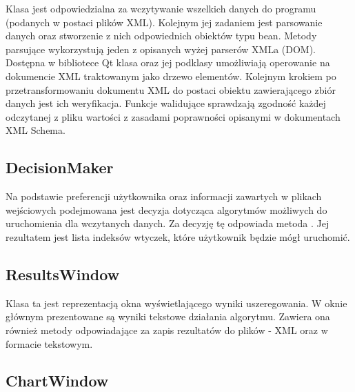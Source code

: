 Klasa  jest odpowiedzialna za wczytywanie wszelkich danych do programu (podanych w postaci plików XML). Kolejnym jej zadaniem jest 
parsowanie danych oraz stworzenie z nich odpowiednich obiektów typu bean. Metody parsujące wykorzystują jeden z opisanych wyżej parserów XMLa (DOM). 
Dostępna w bibliotece Qt klasa  oraz jej podklasy umożliwiają operowanie na dokumencie XML traktowanym jako drzewo elementów. 
Kolejnym krokiem po przetransformowaniu dokumentu XML do postaci obiektu zawierającego zbiór danych jest ich weryfikacja. Funkcje walidujące 
sprawdzają zgodność każdej odczytanej z pliku wartości z zasadami poprawności opisanymi w dokumentach XML Schema.

\subsection{DecisionMaker}

Na podstawie preferencji użytkownika oraz informacji zawartych w plikach wejściowych podejmowana jest decyzja dotycząca algorytmów możliwych 
do uruchomienia dla wczytanych danych. Za decyzję tę odpowiada metoda . Jej rezultatem jest lista indeksów wtyczek, które 
użytkownik będzie mógł uruchomić.

\subsection{ResultsWindow}

Klasa ta jest reprezentacją okna wyświetlającego wyniki uszeregowania. W oknie głównym prezentowane są wyniki tekstowe działania algorytmu. 
Zawiera ona również metody odpowiadające za zapis rezultatów do plików - XML oraz w formacie tekstowym. 

\subsection{ChartWindow}

